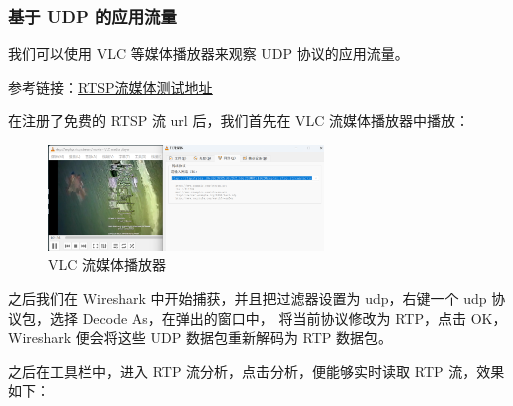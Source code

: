\documentclass[14pt,a4paper,UTF8,twoside]{article}
\begin{document}
\subsubsection{基于 UDP 的应用流量}

我们可以使用 VLC 等媒体播放器来观察 UDP 协议的应用流量。

参考链接：\href{https://blog.csdn.net/u014696856/article/details/126341960?spm=1001.2101.3001.6661.1&utm_medium=distribute.pc_relevant_t0.none-task-blog-2%7Edefault%7EBlogCommendFromBaidu%7ERate-1-126341960-blog-128813090.235%5Ev43%5Epc_blog_bottom_relevance_base9&depth_1-utm_source=distribute.pc_relevant_t0.none-task-blog-2%7Edefault%7EBlogCommendFromBaidu%7ERate-1-126341960-blog-128813090.235%5Ev43%5Epc_blog_bottom_relevance_base9&utm_relevant_index=1}{\underline{RTSP流媒体测试地址}}

在注册了免费的 RTSP 流 url 后，我们首先在 VLC 流媒体播放器中播放：

\begin{figure}[H]
    \centering
    \includegraphics[width=0.65\textwidth]{lab5/url.png}
    \caption{VLC 流媒体播放器}
\end{figure}

之后我们在 Wireshark 中开始捕获，并且把过滤器设置为 udp，右键一个 udp 协议包，选择 Decode As，在弹出的窗口中，
将当前协议修改为 RTP，点击 OK，Wireshark 便会将这些 UDP 数据包重新解码为 RTP 数据包。

之后在工具栏中，进入 RTP 流分析，点击分析，便能够实时读取 RTP 流，效果如下：
\end{document}
